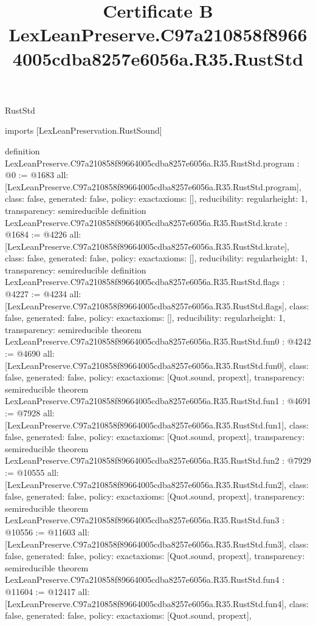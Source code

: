 \begin{lexlean}{RustStd}
\title{Certificate B LexLeanPreserve.C97a210858f89664005cdba8257e6056a.R35.RustStd}
\begin{coremodule}
imports [LexLeanPreservation.RustSound]

definition LexLeanPreserve.C97a210858f89664005cdba8257e6056a.R35.RustStd.program : @0 := @1683 {
  all: [LexLeanPreserve.C97a210858f89664005cdba8257e6056a.R35.RustStd.program],
  class: false,
  generated: false,
  policy: exact{axioms: []},
  reducibility: regular{height: 1},
  transparency: semireducible
}
definition LexLeanPreserve.C97a210858f89664005cdba8257e6056a.R35.RustStd.krate : @1684 := @4226 {
  all: [LexLeanPreserve.C97a210858f89664005cdba8257e6056a.R35.RustStd.krate],
  class: false,
  generated: false,
  policy: exact{axioms: []},
  reducibility: regular{height: 1},
  transparency: semireducible
}
definition LexLeanPreserve.C97a210858f89664005cdba8257e6056a.R35.RustStd.flags : @4227 := @4234 {
  all: [LexLeanPreserve.C97a210858f89664005cdba8257e6056a.R35.RustStd.flags],
  class: false,
  generated: false,
  policy: exact{axioms: []},
  reducibility: regular{height: 1},
  transparency: semireducible
}
theorem LexLeanPreserve.C97a210858f89664005cdba8257e6056a.R35.RustStd.fun0 : @4242 := @4690 {
  all: [LexLeanPreserve.C97a210858f89664005cdba8257e6056a.R35.RustStd.fun0],
  class: false,
  generated: false,
  policy: exact{axioms: [Quot.sound, propext]},
  transparency: semireducible
}
theorem LexLeanPreserve.C97a210858f89664005cdba8257e6056a.R35.RustStd.fun1 : @4691 := @7928 {
  all: [LexLeanPreserve.C97a210858f89664005cdba8257e6056a.R35.RustStd.fun1],
  class: false,
  generated: false,
  policy: exact{axioms: [Quot.sound, propext]},
  transparency: semireducible
}
theorem LexLeanPreserve.C97a210858f89664005cdba8257e6056a.R35.RustStd.fun2 : @7929 := @10555 {
  all: [LexLeanPreserve.C97a210858f89664005cdba8257e6056a.R35.RustStd.fun2],
  class: false,
  generated: false,
  policy: exact{axioms: [Quot.sound, propext]},
  transparency: semireducible
}
theorem LexLeanPreserve.C97a210858f89664005cdba8257e6056a.R35.RustStd.fun3 : @10556 := @11603 {
  all: [LexLeanPreserve.C97a210858f89664005cdba8257e6056a.R35.RustStd.fun3],
  class: false,
  generated: false,
  policy: exact{axioms: [Quot.sound, propext]},
  transparency: semireducible
}
theorem LexLeanPreserve.C97a210858f89664005cdba8257e6056a.R35.RustStd.fun4 : @11604 := @12417 {
  all: [LexLeanPreserve.C97a210858f89664005cdba8257e6056a.R35.RustStd.fun4],
  class: false,
  generated: false,
  policy: exact{axioms: [Quot.sound, propext]},
}
\end{coremodule}
\end{lexlean}
